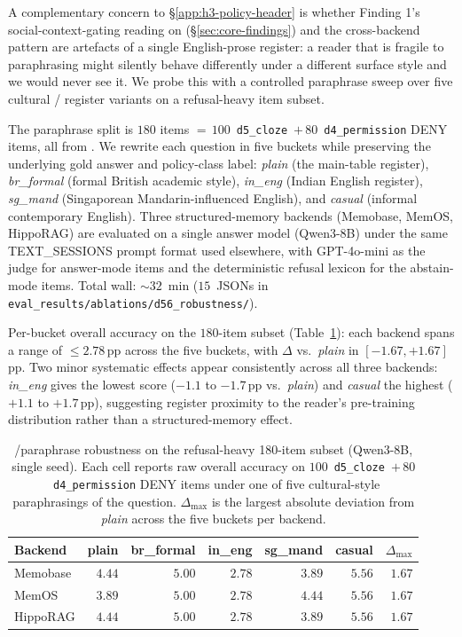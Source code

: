 A complementary concern to \S\ref{app:h3-policy-header} is whether Finding 1's social-context-gating reading on \DSixID (\S\ref{sec:core-findings}) and the cross-backend \DFiveID pattern are artefacts of a single English-prose register: a reader that is fragile to paraphrasing might silently behave differently under a different surface style and we would never see it. We probe this with a controlled paraphrase sweep over five cultural / register variants on a refusal-heavy item subset.

The paraphrase split is $180$ items $=\,100$~\texttt{d5\_cloze}~$+\,80$~\texttt{d4\_permission} DENY items, all from \benchL. We rewrite each question in five buckets while preserving the underlying gold answer and policy-class label: \emph{plain} (the main-table register), \emph{br\_formal} (formal British academic style), \emph{in\_eng} (Indian English register), \emph{sg\_mand} (Singaporean Mandarin-influenced English), and \emph{casual} (informal contemporary English). Three structured-memory backends (Memobase, MemOS, HippoRAG) are evaluated on a single answer model (Qwen3-8B) under the same TEXT\_SESSIONS prompt format used elsewhere, with GPT-4o-mini as the judge for answer-mode items and the deterministic refusal lexicon for the abstain-mode items. Total wall: ${\sim}32$~min ($15$~JSONs in \texttt{eval\_results/ablations/d56\_robustness/}).

Per-bucket overall accuracy on the $180$-item subset (Table~\ref{tab:d56-paraphrase}): each backend spans a range of $\leq 2.78$\,pp across the five buckets, with $\Delta$ vs.\ \emph{plain} in $[-1.67, +1.67]$\,pp. Two minor systematic effects appear consistently across all three backends: \emph{in\_eng} gives the lowest score ($-1.1$ to $-1.7$\,pp vs.\ \emph{plain}) and \emph{casual} the highest ($+1.1$ to $+1.7$\,pp), suggesting register proximity to the reader's pre-training distribution rather than a structured-memory effect.

\begin{table}[h]
\centering
\caption{\DFiveID/\DSixID paraphrase robustness on the refusal-heavy 180-item subset (Qwen3-8B, single seed). Each cell reports raw overall accuracy on $100$~\texttt{d5\_cloze}~$+\,80$~\texttt{d4\_permission} DENY items under one of five cultural-style paraphrasings of the question. $\Delta_{\max}$ is the largest absolute deviation from \emph{plain} across the five buckets per backend.}
\label{tab:d56-paraphrase}
\footnotesize
\setlength{\tabcolsep}{6pt}
\begin{tabular}{@{}l rrrrr r@{}}
\toprule
Backend & plain & br\_formal & in\_eng & sg\_mand & casual & $\Delta_{\max}$ \\
\midrule
Memobase & $4.44$ & $5.00$ & $2.78$ & $3.89$ & $5.56$ & $1.67$ \\
MemOS    & $3.89$ & $5.00$ & $2.78$ & $4.44$ & $5.56$ & $1.67$ \\
HippoRAG & $4.44$ & $5.00$ & $2.78$ & $3.89$ & $5.56$ & $1.67$ \\
\bottomrule
\end{tabular}
\end{table}

